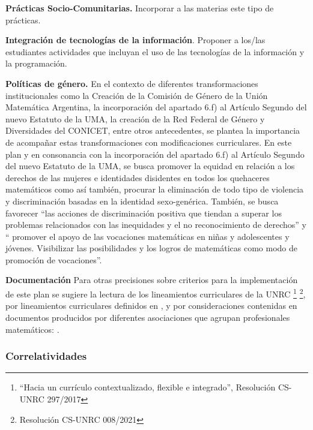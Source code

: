 \documentclass[a4paper, 12pt]{article}
\begin{document}
\begin{description}
\item{\textbf{Prácticas Socio-Comunitarias.} } Incorporar a las materias este tipo de prácticas.


\item{ \textbf{Integración de tecnologías de la información}.} Proponer a los/las estudiantes actividades que incluyan el uso de las tecnologías de la información y la programación.  



\item{\textbf{Políticas de género.}}
En el contexto de diferentes transformaciones institucionales como la Creación de la Comisión de Género de la Unión Matemática Argentina, la incorporación del apartado 6.f) al Artículo Segundo del nuevo Estatuto de la UMA, la creación de la Red Federal de Género y Diversidades del CONICET, entre otros antecedentes, se plantea la importancia de acompañar estas transformaciones con  modificaciones curriculares. 
En este plan y en consonancia con la incorporación del apartado 6.f) al Artículo Segundo del nuevo Estatuto de la UMA, se  busca promover la equidad en relación a los derechos de las mujeres e identidades disidentes en todos los quehaceres matemáticos  como así también,  procurar la eliminación de todo tipo de violencia y discriminación basadas en la identidad sexo-genérica.
También, se busca favorecer “las acciones de discriminación positiva que tiendan a superar los problemas relacionados con las inequidades y el no reconocimiento de derechos”  y    “ promover el apoyo de las vocaciones matemáticas en niñas y adolescentes y jóvenes. Visibilizar las posibilidades y los logros de matemáticas como modo de promoción de vocaciones”.
 
 \item{\textbf{Documentación}} Para otras precisiones sobre criterios para la implementación de este plan se sugiere la lectura de los lineamientos curriculares de la UNRC \footnote{``Hacia   un   currículo contextualizado, flexible e integrado'', Resolución CS-UNRC 297/2017 }
\footnote{ Resolución CS-UNRC 008/2021}, por lineamientos curriculares definidos en  \cite{paniagua2013educacion}, y por consideraciones contenidas en documentos producidos por diferentes asociaciones que agrupan profesionales matemáticos: \cite{uma,society1996siam,society2012siam,damlamian2013educational}.

\end{description}




\subsubsection{Correlatividades}
 
\end{document}
